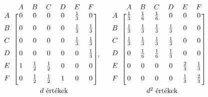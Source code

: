 \documentclass[a4paper,12pt]{article}
\begin{document}
	\[
	\begin{blockarray}{ccccccc}
	&A & B & C & D & E & F \\
	\begin{block}{c [cccccc]}
	A &0 & 0 & 0 & 0 & \frac{1}{3} & 0 \\[6pt] 
	B & 0 & 0 & 0 & 0 & \frac{1}{3} & \frac{1}{3}\\[6pt] 
	C & 0 & 0 & 0 & 0 & \frac{1}{3} & \frac{1}{3}\\[6pt] 
	D & 0 & 0 & 0 & 0 & 0 & \frac{1}{3}\\[6pt] 
	E & 1 & \frac{1}{2} & \frac{1}{2} & 0 & 0 & 0\\ [6pt] 
	F & 0 & \frac{1}{2} & \frac{1}{2} & 1 & 0 & 0\\ [6pt]
	\end{block}
	\multicolumn{7}{c}{\indent $d$ értékek} \\ [6pt]
	\end{blockarray},\quad
	\begin{blockarray}{ccccccc}
	&A & B & C & D & E & F \\ 
	\begin{block}{c [cccccc]}
	A & \frac{1}{3} & \frac{1}{6} & \frac{1}{6} & 0 & 0 & 0 \\[6pt] 
	B & \frac{1}{3} & \frac{1}{3} & \frac{1}{3} & \frac{1}{3} & 0 & 0\\ [6pt] 
	C & \frac{1}{3} & \frac{1}{3} & \frac{1}{3} & \frac{1}{3} & 0 & 0\\[6pt] 
	D & 0 & \frac{1}{6} & \frac{1}{6} & \frac{1}{3} & 0 & 0\\[6pt] 
	E & 0 & 0 & 0 & 0 & \frac{2}{3} & \frac{1}{3}\\ [6pt] 
	F & 0 & 0 & 0 & 0 & \frac{1}{3} & \frac{2}{3}\\ [6pt]
	\end{block}
	\multicolumn{7}{c}{\indent $d^2$ értékek} \\[6pt]
	\end{blockarray}
	\]
	
\end{document}
